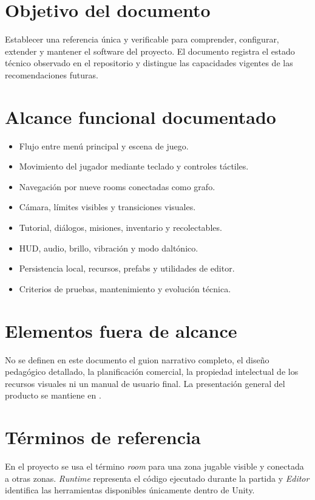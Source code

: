 \documentclass[11pt,a4paper,oneside]{report}
\newcommand{\code}[1]{\texttt{\detokenize{#1}}}
\begin{document}
\section{Objetivo del documento}

Establecer una referencia única y verificable para comprender, configurar, extender y mantener el software del proyecto. El documento registra el estado técnico observado en el repositorio y distingue las capacidades vigentes de las recomendaciones futuras.

\section{Alcance funcional documentado}

\begin{itemize}
  \item Flujo entre menú principal y escena de juego.
  \item Movimiento del jugador mediante teclado y controles táctiles.
  \item Navegación por nueve rooms conectadas como grafo.
  \item Cámara, límites visibles y transiciones visuales.
  \item Tutorial, diálogos, misiones, inventario y recolectables.
  \item HUD, audio, brillo, vibración y modo daltónico.
  \item Persistencia local, recursos, prefabs y utilidades de editor.
  \item Criterios de pruebas, mantenimiento y evolución técnica.
\end{itemize}

\section{Elementos fuera de alcance}

No se definen en este documento el guion narrativo completo, el diseño pedagógico detallado, la planificación comercial, la propiedad intelectual de los recursos visuales ni un manual de usuario final. La presentación general del producto se mantiene en \code{README.md}.

\section{Términos de referencia}

En el proyecto se usa el término \textit{room} para una zona jugable visible y conectada a otras zonas. \textit{Runtime} representa el código ejecutado durante la partida y \textit{Editor} identifica las herramientas disponibles únicamente dentro de Unity.
\end{document}
